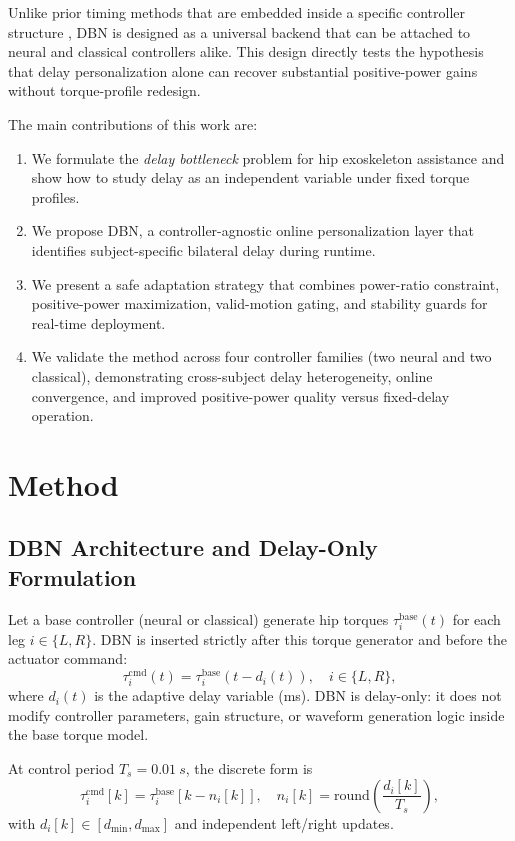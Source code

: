 \documentclass[lettersize,journal]{IEEEtran}
\begin{document}
Unlike prior timing methods that are embedded inside a specific controller structure \cite{lim2019tro,lim2023ral,zhou2026positiveassist}, DBN is designed as a universal backend that can be attached to neural and classical controllers alike. This design directly tests the hypothesis that delay personalization alone can recover substantial positive-power gains without torque-profile redesign.

The main contributions of this work are:
\begin{enumerate}
\item We formulate the \emph{delay bottleneck} problem for hip exoskeleton assistance and show how to study delay as an independent variable under fixed torque profiles.
\item We propose DBN, a controller-agnostic online personalization layer that identifies subject-specific bilateral delay during runtime.
\item We present a safe adaptation strategy that combines power-ratio constraint, positive-power maximization, valid-motion gating, and stability guards for real-time deployment.
\item We validate the method across four controller families (two neural and two classical), demonstrating cross-subject delay heterogeneity, online convergence, and improved positive-power quality versus fixed-delay operation.
\end{enumerate}

\section{Method}
\subsection{DBN Architecture and Delay-Only Formulation}
Let a base controller (neural or classical) generate hip torques
$\tau^{\mathrm{base}}_i(t)$ for each leg $i\in\{L,R\}$. DBN is inserted strictly
after this torque generator and before the actuator command:
\begin{equation}
\tau^{\mathrm{cmd}}_i(t)=\tau^{\mathrm{base}}_i\!\left(t-d_i(t)\right), \quad i\in\{L,R\},
\label{eq:dbn_ct}
\end{equation}
where $d_i(t)$ is the adaptive delay variable (ms). DBN is delay-only:
it does not modify controller parameters, gain structure, or waveform
generation logic inside the base torque model.

At control period $T_s=\SI{0.01}{s}$, the discrete form is
\begin{equation}
\tau^{\mathrm{cmd}}_i[k]=\tau^{\mathrm{base}}_i[k-n_i[k]], \quad
n_i[k]=\mathrm{round}\!\left(\frac{d_i[k]}{T_s}\right),
\label{eq:dbn_dt}
\end{equation}
with $d_i[k]\in[d_{\min},d_{\max}]$ and independent left/right updates.
\end{document}
